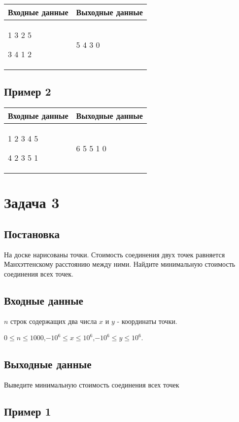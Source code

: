 \documentclass[a4]{article}
\begin{document}
\begin{table}[H]
\begin{center}
\begin{tabular}{|m{4cm}|m{4cm}|}
\hline
Входные данные & Выходные данные \\ \hline
1 3 2 5

3 4 1 2
&
5
4
3
0
\\ \hline
\end{tabular}
\end{center}
\end{table}
\subsection*{Пример 2}
\label{sec:orgd7d348d}

\begin{table}[H]
\begin{center}
\begin{tabular}{|m{4cm}|m{4cm}|}
\hline
Входные данные & Выходные данные \\ \hline
1 2 3 4 5

4 2 3 5 1
&
6
5
5
1
0
\\ \hline
\end{tabular}
\end{center}
\end{table}
\pagebreak
\section*{Задача 3}
\label{sec:org570b899}
\subsection*{Постановка}
\label{sec:orga2b5149}
На доске нарисованы точки. Стоимость соединения двух точек равняется Манхэттенскому расстоянию между ними.
Найдите минимальную стоимость соединения всех точек.  
\subsection*{Входные данные}
\label{sec:orgeb4908d}
$n$ строк содержащих два числа $x$ и $y$ - координаты точки.

$0\leq n \leq 1000$,$-10^6 \leq x \leq 10^6$,$-10^6 \leq y \leq 10^6$.
\subsection*{Выходные данные}
\label{sec:orged795e8}
Выведите минимальную стоимость соединения всех точек
\subsection*{Пример 1}
\label{sec:org6a26c04}
\end{document}
